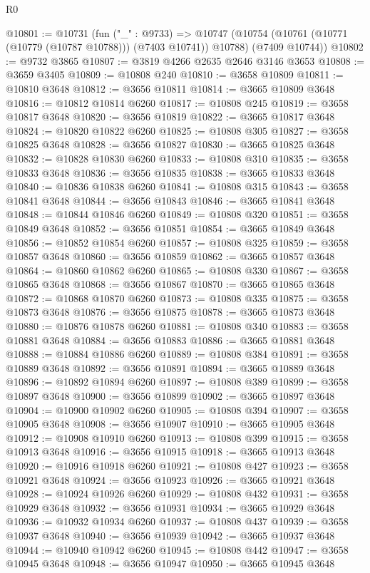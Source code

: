 \begin{lexlean}{R0}
\begin{coremodule}
@10801 := @10731
    (fun ("_" : @9733) =>
    @10747 (@10754 (@10761 (@10771 (@10779 (@10787 @10788))) (@7403 @10741)) @10788) (@7409 @10744))
@10802 := @9732 @3865
@10807 := @3819 @4266 @2635 @2646 @3146 @3653
@10808 := @3659 @3405
@10809 := @10808 @240
@10810 := @3658 @10809
@10811 := @10810 @3648
@10812 := @3656 @10811
@10814 := @3665 @10809 @3648
@10816 := @10812 @10814 @6260
@10817 := @10808 @245
@10819 := @3658 @10817 @3648
@10820 := @3656 @10819
@10822 := @3665 @10817 @3648
@10824 := @10820 @10822 @6260
@10825 := @10808 @305
@10827 := @3658 @10825 @3648
@10828 := @3656 @10827
@10830 := @3665 @10825 @3648
@10832 := @10828 @10830 @6260
@10833 := @10808 @310
@10835 := @3658 @10833 @3648
@10836 := @3656 @10835
@10838 := @3665 @10833 @3648
@10840 := @10836 @10838 @6260
@10841 := @10808 @315
@10843 := @3658 @10841 @3648
@10844 := @3656 @10843
@10846 := @3665 @10841 @3648
@10848 := @10844 @10846 @6260
@10849 := @10808 @320
@10851 := @3658 @10849 @3648
@10852 := @3656 @10851
@10854 := @3665 @10849 @3648
@10856 := @10852 @10854 @6260
@10857 := @10808 @325
@10859 := @3658 @10857 @3648
@10860 := @3656 @10859
@10862 := @3665 @10857 @3648
@10864 := @10860 @10862 @6260
@10865 := @10808 @330
@10867 := @3658 @10865 @3648
@10868 := @3656 @10867
@10870 := @3665 @10865 @3648
@10872 := @10868 @10870 @6260
@10873 := @10808 @335
@10875 := @3658 @10873 @3648
@10876 := @3656 @10875
@10878 := @3665 @10873 @3648
@10880 := @10876 @10878 @6260
@10881 := @10808 @340
@10883 := @3658 @10881 @3648
@10884 := @3656 @10883
@10886 := @3665 @10881 @3648
@10888 := @10884 @10886 @6260
@10889 := @10808 @384
@10891 := @3658 @10889 @3648
@10892 := @3656 @10891
@10894 := @3665 @10889 @3648
@10896 := @10892 @10894 @6260
@10897 := @10808 @389
@10899 := @3658 @10897 @3648
@10900 := @3656 @10899
@10902 := @3665 @10897 @3648
@10904 := @10900 @10902 @6260
@10905 := @10808 @394
@10907 := @3658 @10905 @3648
@10908 := @3656 @10907
@10910 := @3665 @10905 @3648
@10912 := @10908 @10910 @6260
@10913 := @10808 @399
@10915 := @3658 @10913 @3648
@10916 := @3656 @10915
@10918 := @3665 @10913 @3648
@10920 := @10916 @10918 @6260
@10921 := @10808 @427
@10923 := @3658 @10921 @3648
@10924 := @3656 @10923
@10926 := @3665 @10921 @3648
@10928 := @10924 @10926 @6260
@10929 := @10808 @432
@10931 := @3658 @10929 @3648
@10932 := @3656 @10931
@10934 := @3665 @10929 @3648
@10936 := @10932 @10934 @6260
@10937 := @10808 @437
@10939 := @3658 @10937 @3648
@10940 := @3656 @10939
@10942 := @3665 @10937 @3648
@10944 := @10940 @10942 @6260
@10945 := @10808 @442
@10947 := @3658 @10945 @3648
@10948 := @3656 @10947
@10950 := @3665 @10945 @3648

\end{coremodule}
\end{lexlean}
